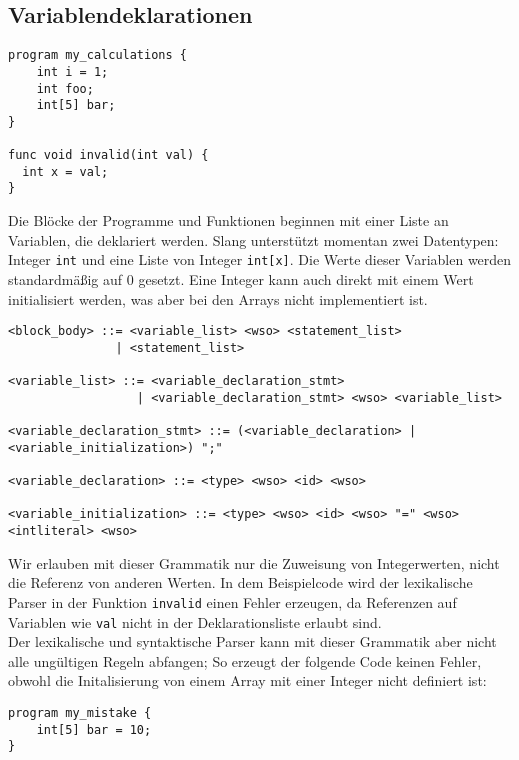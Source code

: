 \subsection{Variablendeklarationen}

\begin{lstlisting}
program my_calculations {
    int i = 1;
    int foo;
    int[5] bar;
}

func void invalid(int val) {
  int x = val;
}
\end{lstlisting}

Die Blöcke der Programme und Funktionen beginnen mit einer Liste an Variablen, die deklariert werden.
Slang unterstützt momentan zwei Datentypen: Integer \texttt{int} und eine Liste von Integer \texttt{int[x]}.
Die Werte dieser Variablen werden standardmäßig auf 0 gesetzt.
Eine Integer kann auch direkt mit einem Wert initialisiert werden, was aber bei den Arrays nicht implementiert ist.\\

\begin{lstlisting}
<block_body> ::= <variable_list> <wso> <statement_list>
               | <statement_list>

<variable_list> ::= <variable_declaration_stmt>
                  | <variable_declaration_stmt> <wso> <variable_list>

<variable_declaration_stmt> ::= (<variable_declaration> | <variable_initialization>) ";"

<variable_declaration> ::= <type> <wso> <id> <wso>

<variable_initialization> ::= <type> <wso> <id> <wso> "=" <wso> <intliteral> <wso>
\end{lstlisting}

Wir erlauben mit dieser Grammatik nur die Zuweisung von Integerwerten, nicht die Referenz von anderen Werten.
In dem Beispielcode wird der lexikalische Parser in der Funktion \texttt{invalid} einen Fehler erzeugen, da Referenzen auf Variablen wie \texttt{val} nicht in der Deklarationsliste erlaubt sind.\\

Der lexikalische und syntaktische Parser kann mit dieser Grammatik aber nicht alle ungültigen Regeln abfangen;
So erzeugt der folgende Code keinen Fehler, obwohl die Initalisierung von einem Array mit einer Integer nicht definiert ist:\\

\begin{lstlisting}
program my_mistake {
    int[5] bar = 10;
}
\end{lstlisting}

